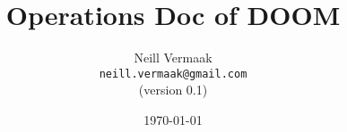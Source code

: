 \title{ \huge{ \textbf{ \luma{} Operations Doc of DOOM } } }

\author{
    Neill Vermaak\\
    \texttt{neill.vermaak@gmail.com}\\
    (version 0.1)
}

\date{\today}

\maketitle
\newpage
